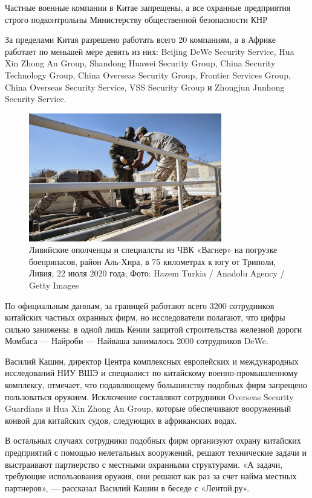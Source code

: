\begin{center}
    \Large
    Частные военные компании в Китае запрещены, а все охранные предприятия строго подконтрольны Министерству общественной безопасности КНР
\end{center}

За пределами Китая разрешено работать всего 20 компаниям, а в Африке работает по меньшей мере девять из них: Beijing DeWe Security Service, Hua Xin Zhong An Group, Shandong Huawei Security Group, China Security Technology Group, China Overseas Security Group, Frontier Services Group, China Overseas Security Service, VSS Security Group и Zhongjun Junhong Security Service.


\begin{figure}[h]
    \centering
    \includegraphics[width=0.75\textwidth]{img/pmc_africa_6.jpg}
    \caption{Ливийские ополченцы и специалсты из ЧВК «Вагнер» на погрузке боеприпасов, район Аль-Хира, в 75 километрах к югу от Триполи, Ливия, 22 июля 2020 года; Фото: Hazem Turkia / Anadolu Agency / Getty Images}
\end{figure}

По официальным данным, за границей работают всего 3200 сотрудников китайских частных охранных фирм, но исследователи полагают, что цифры сильно занижены: в одной лишь Кении защитой строительства железной дороги Момбаса — Найроби — Найваша занималось 2000 сотрудников DeWe.

Василий Кашин, директор Центра комплексных европейских и международных исследований НИУ ВШЭ и специалист по китайскому военно-промышленному комплексу, отмечает, что подавляющему большинству подобных фирм запрещено пользоваться оружием. Исключение составляют сотрудники Overseas Security Guardians и Hua Xin Zhong An Group, которые обеспечивают вооруженный конвой для китайских судов, следующих в африканских водах.

В остальных случаях сотрудники подобных фирм организуют охрану китайских предприятий с помощью нелетальных вооружений, решают технические задачи и выстраивают партнерство с местными охранными структурами. «А задачи, требующие использования оружия, они решают как раз за счет найма местных партнеров», — рассказал Василий Кашин в беседе с «Лентой.ру».

